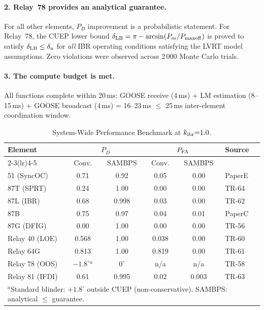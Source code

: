 \documentclass[journal,twoside]{IEEEtran}
\begin{document}
\paragraph{2. Relay~78 provides an analytical guarantee.}
For all other elements, $P_D$ improvement is a probabilistic statement.
For Relay~78, the CUEP lower bound $\delta_{\rm LB} = \pi - \arcsin(P_m/P_{\rm maxeff})$
is proved to satisfy $\delta_{\rm LB} \leq \delta_u$ for \emph{all} IBR
operating conditions satisfying the LVRT model assumptions.
Zero violations were observed across 2\,000 Monte Carlo trials.

\paragraph{3. The compute budget is met.}
All functions complete within 20\,ms: GOOSE receive (4\,ms) + LM estimation
(8--15\,ms) + GOOSE broadcast (4\,ms) = 16--23\,ms $\leq$ 25\,ms
inter-element coordination window.

\begin{table}[h]
  \centering
  \caption{System-Wide Performance Benchmark at $k_{\rm ibr}{=}1.0$.}
  \label{tab:perf}
  \small
  \begin{tabular}{@{}p{2.1cm}ccccp{0.9cm}@{}}
    \toprule
    Element & \multicolumn{2}{c}{$P_D$} & \multicolumn{2}{c}{$P_{\rm FA}$}
            & Source \\
    \cmidrule(lr){2-3}\cmidrule(lr){4-5}
            & Conv. & SAMBPS & Conv. & SAMBPS & \\
    \midrule
    51 (SyncOC)    & 0.71 & 0.92  & 0.05 & 0.00  & PaperE \\
    87T (SPRT)     & 0.24 & 1.00  & 0.00 & 0.00  & TR-64  \\
    87L (IBR)      & 0.68 & 0.998 & 0.03 & 0.00  & TR-62  \\
    87B            & 0.75 & 0.97  & 0.04 & 0.01  & PaperC \\
    87G (DFIG)     & 0.00 & 1.00  & 0.00 & 0.00  & TR-56  \\
    Relay 40 (LOE) & 0.568 & 1.00 & 0.038 & 0.00 & TR-60  \\
    Relay 64G      & 0.813 & 1.00 & 0.819 & 0.00 & TR-61  \\
    Relay 78 (OOS) & $-1.8^\circ$$^a$ & $0^\circ$ & n/a & n/a & TR-58 \\
    Relay 81 (IFDI)& 0.61 & 0.995 & 0.02 & 0.003 & TR-63  \\
    \bottomrule
    \multicolumn{6}{l}{\scriptsize $^a$Standard blinder: $+1.8^\circ$ outside CUEP (non-conservative).
      SAMBPS: analytical $\leq$ guarantee.}
  \end{tabular}
\end{table}
\end{document}
